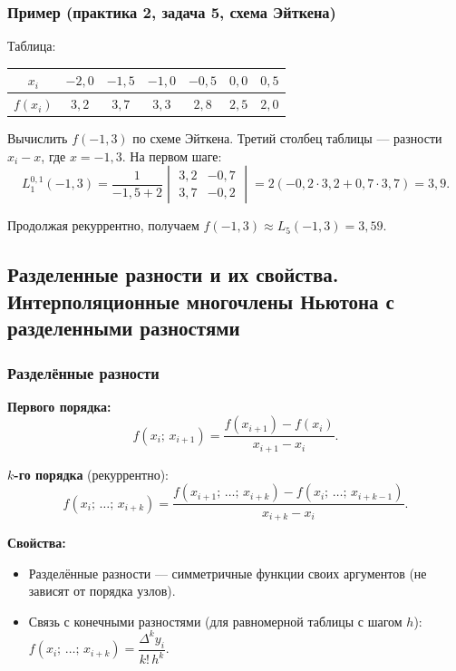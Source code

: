 \subsubsection*{Пример (практика 2, задача 5, схема Эйткена)}

Таблица:

\begin{center}
\begin{tabular}{c|cccccc}
    $x_i$ & $-2{,}0$ & $-1{,}5$ & $-1{,}0$ & $-0{,}5$ & $0{,}0$ & $0{,}5$ \\
    \hline
    $f(x_i)$ & $3{,}2$ & $3{,}7$ & $3{,}3$ & $2{,}8$ & $2{,}5$ & $2{,}0$
\end{tabular}
\end{center}

Вычислить $f(-1{,}3)$ по схеме Эйткена. Третий столбец таблицы --- разности $x_i - x$, где $x = -1{,}3$. На первом шаге:
\[
    L_1^{0,1}(-1{,}3) = \frac{1}{-1{,}5+2}
    \begin{vmatrix}
    3{,}2 & -0{,}7 \\
    3{,}7 & -0{,}2
    \end{vmatrix}
    = 2(-0{,}2 \cdot 3{,}2 + 0{,}7 \cdot 3{,}7) = 3{,}9.
\]

Продолжая рекуррентно, получаем $f(-1{,}3) \approx L_5(-1{,}3) = 3{,}59$.


\subsection{Разделенные разности и их свойства. Интерполяционные многочлены Ньютона с разделенными разностями}

\subsubsection*{Разделённые разности}

\textbf{Первого порядка:}
\[
    f(x_i;\, x_{i+1}) = \frac{f(x_{i+1}) - f(x_i)}{x_{i+1} - x_i}.
\]

\textbf{$k$-го порядка} (рекуррентно):
\[
    f(x_i;\, \ldots;\, x_{i+k}) = \frac{f(x_{i+1};\, \ldots;\, x_{i+k}) - f(x_i;\, \ldots;\, x_{i+k-1})}{x_{i+k} - x_i}.
\]

\textbf{Свойства:}
\begin{itemize}
    \item Разделённые разности --- симметричные функции своих аргументов (не зависят от порядка узлов).
    \item Связь с конечными разностями (для равномерной таблицы с шагом $h$):
    $f(x_i;\, \ldots;\, x_{i+k}) = \dfrac{\Delta^k y_i}{k!\, h^k}$.
\end{itemize}

